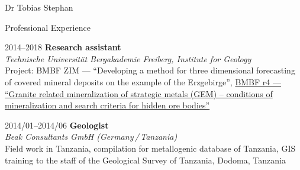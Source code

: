 \documentclass[10pt, paper=letter]{scrartcl} %
\begin{document}
\begin{cv}{Dr Tobias Stephan}
\begin{cvlist}{Professional Experience}
        \item[2014--2018] \textbf{Research assistant}\\
        \textit{Technische Universit\"at Bergakademie Freiberg, Institute for Geology}
        \\ Project: BMBF ZIM --- \enquote{Developing a method for three dimensional forecasting of covered mineral deposits on the example of the Erzgebirge}, \href{https://www.gfz-potsdam.de/en/section/inorganic-and-isotope-geochemistry/projects/prohydrogen-more-mofette-research-prosalz-gramm-sugar-gem-amrep-halmahera-gogaf-irup-spp-sample-ketzin-co2-cosanostra-inkaba-yeafrica-dafgas/gem/bmbf-r4-gem}{BMBF r4 --- \enquote{Granite related mineralization of strategic metals (GEM) – conditions of mineralization and search criteria for hidden ore bodies}}
        \item[2014/01--2014/06] \textbf{Geologist}\\
        \textit{Beak Consultants GmbH (Germany\,/\,Tanzania)}\\
        Field work in Tanzania, compilation for metallogenic database of Tanzania, GIS training to the staff of the Geological Survey of Tanzania, Dodoma, Tanzania        

\end{cvlist}
\end{cv}
\end{document}
